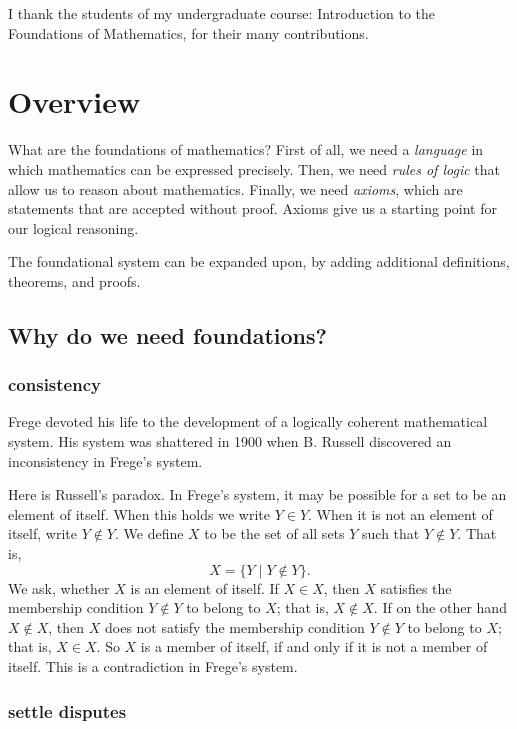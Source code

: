 \documentclass[cup9a]{cupbook}
\begin{document}
   I thank the students of my undergraduate course: Introduction to the Foundations of Mathematics, for their many contributions.


   \chapter{Overview} 

   What are the foundations of mathematics?  First of all, we need a {\it language} in which mathematics can be expressed precisely.  Then, we need {\it rules of logic} that allow us to reason about mathematics.  Finally, we need {\it axioms}, which are statements that are accepted without proof.  Axioms give us a starting point for our logical reasoning.

  The foundational system can be expanded upon, by adding additional definitions, theorems, and proofs.

\section{Why do we need foundations?}

\subsection{consistency}

Frege devoted his life to the development of a logically coherent mathematical system.  His system was shattered in 1900 when B. Russell discovered an inconsistency in Frege's system.  

Here is Russell's paradox.  In Frege's system, it may be possible for a set to be an element of itself.  When this holds we write $Y\in Y$.  When it is not an element of itself, write $Y\not\in Y$.   We define $X$ to be the set of all sets $Y$ such that $Y\not\in Y$.  That is,
    $$X = \{Y\mid Y\not\in Y\}.$$
We ask, whether $X$ is an element of itself.    If $X\in X$, then $X$ satisfies the membership condition $Y\not\in Y$ to belong to $X$;  that is, $X\not\in X$.
If on the other hand $X\not\in X$, then $X$ does not satisfy the membership condition $Y\not\in Y$ to belong to $X$; that is, $X\in X$.  So $X$ is a member of itself, if and only if it is not a member of itself.  This is a contradiction in Frege's system.

\subsection{settle disputes}
\end{document}
